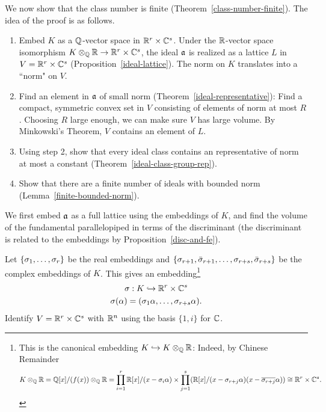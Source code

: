 We now show that the class number is finite (Theorem~\ref{class-number-finite}). The idea of the proof is as follows.
\begin{enumerate}
\item Embed $K$ as a $\mathbb{Q}$-vector space in $\mathbb{R}^r\times \mathbb{C}^s$. Under the $\mathbb{R}$-vector space isomorphism $K\otimes_{\mathbb{Q}} \mathbb{R}\to \mathbb{R}^r\times \mathbb{C}^s$, the ideal $\mathfrak{a}$ is realized as a lattice $L$ in $V=\mathbb{R}^r\times \mathbb{C}^s$ (Proposition~\ref{ideal-lattice}). The norm on $K$ translates into a ``norm" on $V$.
\item Find an element in $\mathfrak{a}$ of small norm (Theorem~\ref{ideal-representative}): Find a compact, symmetric convex set in $V$ consisting of elements of norm at most $R$. Choosing $R$ large enough, we can make sure $V$ has large volume. By Minkowski's Theorem, $V$ contains an element of $L$.
\item Using step 2, show that every ideal class contains an representative of norm at most a constant (Theorem~\ref{ideal-class-group-rep}).
\item Show that there are a finite number of ideals with bounded norm (Lemma~\ref{finite-bounded-norm}).
\end{enumerate}
We first embed $\mathfrak{a}$ as a full lattice using the embeddings of $K$, and find the volume of the fundamental parallelopiped in terms of the discriminant (the discriminant is related to the embeddings by Proposition~\ref{disc-and-fe}).

Let $\{\sigma_1,\ldots, \sigma_r\}$ be the real embeddings and $\{\sigma_{r+1},\bar{\sigma}_{r+1},\ldots, \sigma_{r+s},\bar{\sigma}_{r+s}\}$ be the complex embeddings of $K$. This gives an embedding\footnote{This is the canonical embedding $K\hookrightarrow K\otimes_{\mathbb{Q}}\mathbb{R}$: Indeed, by Chinese Remainder
\[
K\otimes_{\mathbb{Q}}\mathbb{R} = \mathbb{Q}[x]/(f(x))\otimes_{\mathbb{Q}}\mathbb{R} = \prod_{i=1}^r \mathbb{R}[x]/(x-\sigma_i\alpha) \times \prod_{j=1}^s (\mathbb{R}[x]/(x-\sigma_{r+j}\alpha)(x-\overline{\sigma_{r+j}}\alpha))\cong \mathbb{R}^r\times \mathbb{C}^s.
\]}
\begin{gather*}
\sigma:K\hookrightarrow \mathbb{R}^r\times \mathbb{C}^s\\
\sigma(\alpha)=(\sigma_1\alpha,\ldots, \sigma_{r+s}\alpha).
\end{gather*}
Identify $V=\mathbb{R}^r\times \mathbb{C}^s$ with $\mathbb{R}^n$ using the basis $\{1,i\}$ for $\mathbb{C}$.

